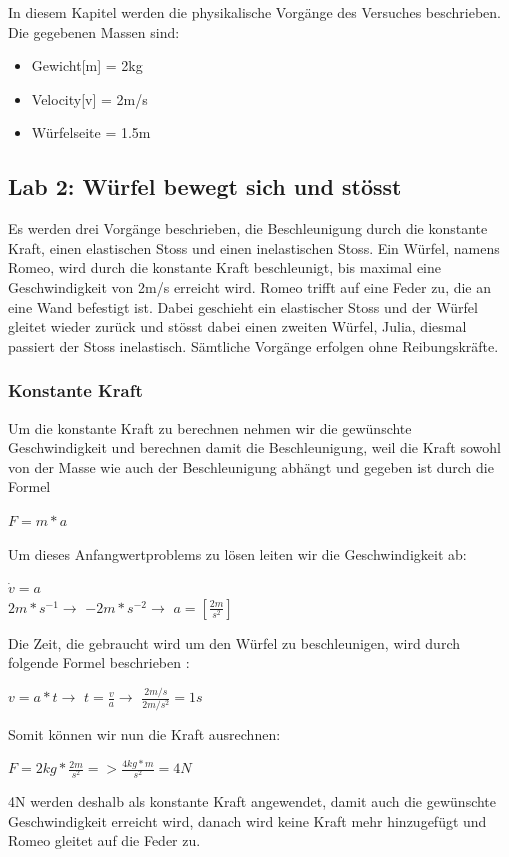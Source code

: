 \documentclass[../main.tex]{subfiles}
\begin{document}
In diesem Kapitel werden die physikalische Vorgänge des Versuches beschrieben. 
Die gegebenen Massen sind:
\begin{itemize}
	\item Gewicht[m] = 2kg
	\item Velocity[v] = 2m/s
	\item Würfelseite = 1.5m
\end{itemize}
\subsection{Lab 2: Würfel bewegt sich und stösst}
Es werden drei Vorgänge beschrieben, die Beschleunigung durch die konstante Kraft, einen elastischen Stoss und einen inelastischen Stoss.
Ein Würfel, namens Romeo, wird durch die konstante Kraft beschleunigt, bis maximal eine Geschwindigkeit von 2m/s erreicht wird.
Romeo trifft auf eine Feder zu, die an eine Wand befestigt ist.
Dabei geschieht ein elastischer Stoss und der Würfel gleitet wieder zurück und stösst dabei einen zweiten Würfel,
Julia, diesmal passiert der Stoss inelastisch. Sämtliche Vorgänge erfolgen ohne Reibungskräfte.
\subsubsection{Konstante Kraft}
Um die konstante Kraft zu berechnen nehmen wir die gewünschte Geschwindigkeit und berechnen damit die Beschleunigung,
weil die Kraft sowohl von der Masse wie auch der Beschleunigung abhängt und
gegeben ist durch die Formel\cite{tiplerpaula.PhysikFurStudierende}
\begin{mdframed}
		 $F = m*a$
\end{mdframed}
Um dieses Anfangwertproblems zu lösen leiten wir die Geschwindigkeit ab\cite{tiplerpaula.PhysikFurStudierende}:
\begin{mdframed}
		 $\dot{v} = a$\\
$2m*s^{-1} \rightarrow$  $-2m*s^{-2} \rightarrow$  $a = [\frac{2m}{s^{2}}]$
\end{mdframed}
Die Zeit, die gebraucht wird um den Würfel zu beschleunigen, wird durch folgende Formel
beschrieben \cite{tiplerpaula.PhysikFurStudierende}:
\begin{mdframed}
 $v=a*t \rightarrow$ $t=\frac{v}{a} \rightarrow$ $\frac{2m/s}{2m/s^{2}} = 1s$
\end{mdframed}
Somit können wir nun die Kraft ausrechnen:
\begin{mdframed}
$F = 2kg * \frac{2m}{s^{2}} => \frac{4kg*m}{s^{2}} = 4N$
\end{mdframed}
4N werden deshalb als konstante Kraft angewendet, damit auch die gewünschte Geschwindigkeit
erreicht wird, danach wird keine Kraft mehr hinzugefügt und Romeo gleitet auf die Feder zu.
\newpage
\end{document}
